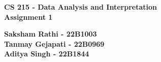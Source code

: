 \documentclass{article}
\begin{document}
\begin{titlepage}
\centering
\vspace{5cm}

\textbf{\Huge CS 215 - Data Analysis and Interpretation} \\
\vspace{0.5cm}
\textbf{\Large Assignment 1} \\
\vspace{10cm}


\textbf{\Large Saksham Rathi - 22B1003}\\
\vspace{0.2cm}
\textbf{\Large Tanmay Gejapati - 22B0969}\\
\vspace{0.2cm}
\textbf{\Large Aditya Singh - 22B1844}\\
\vspace{0.2cm}
\vspace{5cm}

\end{titlepage}
\end{document}
